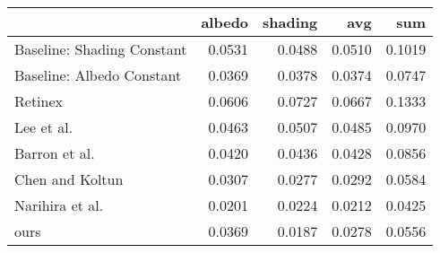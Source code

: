\begin{tabular}{lrrrr}
\toprule
{} &  albedo &  shading &     avg &     sum \\
\midrule
Baseline: Shading Constant          &  0.0531 &   0.0488 &  0.0510 &  0.1019 \\
Baseline: Albedo Constant           &  0.0369 &   0.0378 &  0.0374 &  0.0747 \\
Retinex \cite{grosse2009}           &  0.0606 &   0.0727 &  0.0667 &  0.1333 \\
Lee et al. \cite{lee2012}           &  0.0463 &   0.0507 &  0.0485 &  0.0970 \\
Barron et al. \cite{barron2015}     &  0.0420 &   0.0436 &  0.0428 &  0.0856 \\
Chen and Koltun \cite{chen2013}     &  0.0307 &   0.0277 &  0.0292 &  0.0584 \\
Narihira et al. \cite{narihira2015} &  0.0201 &   0.0224 &  0.0212 &  0.0425 \\
ours                                &  0.0369 &   0.0187 &  0.0278 &  0.0556 \\
\bottomrule
\end{tabular}

